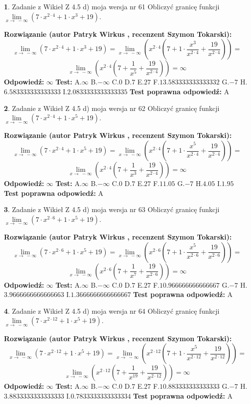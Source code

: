 \documentclass[12pt, a4paper]{article}
\theoremstyle{definition} %
\newtheorem{zad}{}
\newcommand{\zadStart}[1]{\begin{zad}#1\newline}
\newcommand{\zadStop}{\end{zad}}
\newcommand{\rozwStart}[2]{\noindent \textbf{Rozwiązanie (autor #1 , recenzent #2): }\newline}
\newcommand{\rozwStop}{\newline}
\newcommand{\odpStart}{\noindent \textbf{Odpowiedź:}\newline}
\newcommand{\odpStop}{\newline}
\newcommand{\testStart}{\noindent \textbf{Test:}\newline}
\newcommand{\testStop}{\newline}
\newcommand{\kluczStart}{\noindent \textbf{Test poprawna odpowiedź:}\newline}
\newcommand{\kluczStop}{\newline}
\begin{document}
\zadStart{Zadanie z Wikieł Z 4.5 d) moja wersja nr 61}
Obliczyć granicę funkcji  $\lim\limits_{x\to\ -\infty}(7 \cdot x^{2\cdot4}+1 \cdot x^{3}+19)$.
\zadStop
\rozwStart{Patryk Wirkus}{Szymon Tokarski}
$$\lim\limits_{x\to\ -\infty}(7 \cdot x^{2\cdot4}+1 \cdot x^{3}+19) = \lim\limits_{x\to\ -\infty}(x^{2\cdot4}(7 +1 \cdot \frac{x^{3}}{x^{2\cdot4}}+\frac{19}{x^{2\cdot4}})) =$$ $$\lim\limits_{x\to\ -\infty}(x^{2\cdot4}(7 +\frac{1}{x^{5}}+\frac{19}{x^{2\cdot4}})) =\infty$$
\rozwStop
\odpStart
$\infty$
\odpStop
\testStart
A.$\infty$ B.$-\infty$ C.$0$ D.$7$ E.$27$
F.$13.583333333333332$ G.$-7$
H.$6.583333333333333$
I.$2.0833333333333335$
\testStop
\kluczStart
A
\kluczStop



\zadStart{Zadanie z Wikieł Z 4.5 d) moja wersja nr 62}
Obliczyć granicę funkcji  $\lim\limits_{x\to\ -\infty}(7 \cdot x^{2\cdot4}+1 \cdot x^{5}+19)$.
\zadStop
\rozwStart{Patryk Wirkus}{Szymon Tokarski}
$$\lim\limits_{x\to\ -\infty}(7 \cdot x^{2\cdot4}+1 \cdot x^{5}+19) = \lim\limits_{x\to\ -\infty}(x^{2\cdot4}(7 +1 \cdot \frac{x^{5}}{x^{2\cdot4}}+\frac{19}{x^{2\cdot4}})) =$$ $$\lim\limits_{x\to\ -\infty}(x^{2\cdot4}(7 +\frac{1}{x^{3}}+\frac{19}{x^{2\cdot4}})) =\infty$$
\rozwStop
\odpStart
$\infty$
\odpStop
\testStart
A.$\infty$ B.$-\infty$ C.$0$ D.$7$ E.$27$
F.$11.05$ G.$-7$
H.$4.05$
I.$1.95$
\testStop
\kluczStart
A
\kluczStop



\zadStart{Zadanie z Wikieł Z 4.5 d) moja wersja nr 63}
Obliczyć granicę funkcji  $\lim\limits_{x\to\ -\infty}(7 \cdot x^{2\cdot6}+1 \cdot x^{5}+19)$.
\zadStop
\rozwStart{Patryk Wirkus}{Szymon Tokarski}
$$\lim\limits_{x\to\ -\infty}(7 \cdot x^{2\cdot6}+1 \cdot x^{5}+19) = \lim\limits_{x\to\ -\infty}(x^{2\cdot6}(7 +1 \cdot \frac{x^{5}}{x^{2\cdot6}}+\frac{19}{x^{2\cdot6}})) =$$ $$\lim\limits_{x\to\ -\infty}(x^{2\cdot6}(7 +\frac{1}{x^{7}}+\frac{19}{x^{2\cdot6}})) =\infty$$
\rozwStop
\odpStart
$\infty$
\odpStop
\testStart
A.$\infty$ B.$-\infty$ C.$0$ D.$7$ E.$27$
F.$10.966666666666667$ G.$-7$
H.$3.9666666666666663$
I.$1.3666666666666667$
\testStop
\kluczStart
A
\kluczStop



\zadStart{Zadanie z Wikieł Z 4.5 d) moja wersja nr 64}
Obliczyć granicę funkcji  $\lim\limits_{x\to\ -\infty}(7 \cdot x^{2\cdot12}+1 \cdot x^{5}+19)$.
\zadStop
\rozwStart{Patryk Wirkus}{Szymon Tokarski}
$$\lim\limits_{x\to\ -\infty}(7 \cdot x^{2\cdot12}+1 \cdot x^{5}+19) = \lim\limits_{x\to\ -\infty}(x^{2\cdot12}(7 +1 \cdot \frac{x^{5}}{x^{2\cdot12}}+\frac{19}{x^{2\cdot12}})) =$$ $$\lim\limits_{x\to\ -\infty}(x^{2\cdot12}(7 +\frac{1}{x^{19}}+\frac{19}{x^{2\cdot12}})) =\infty$$
\rozwStop
\odpStart
$\infty$
\odpStop
\testStart
A.$\infty$ B.$-\infty$ C.$0$ D.$7$ E.$27$
F.$10.883333333333333$ G.$-7$
H.$3.8833333333333333$
I.$0.7833333333333334$
\testStop
\kluczStart
A
\kluczStop
\end{document}
